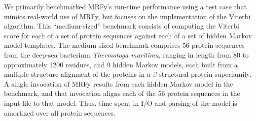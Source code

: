 We primarily benchmarked MRFy's run-time performance using a test case that
mimics real-world use of MRFy, but focuses on the implementation of the Viterbi
algorithm.
This ``medium-sized'' benchmark consists of computing the Viterbi score for
each of a set of protein sequences against each of a set of hidden Markov model
templates.
The medium-sized benchmark comprises 56 protein sequences from the deep-sea 
bacterium \emph{Thermotoga maritima},
ranging in length from 80 to approximately 1200 residues, and 9 hidden Markov
models, each built from a multiple structure alignment of the proteins in
a $\beta$-structural protein superfamily.
A single invocation of MRFy results from each hidden Markov model in the 
benchmark, and that invocation aligns each of the 56 protein sequences in the 
input file to that model. Thus, time spent in I/O and parsing of the model
is amortized over all protein sequences.
